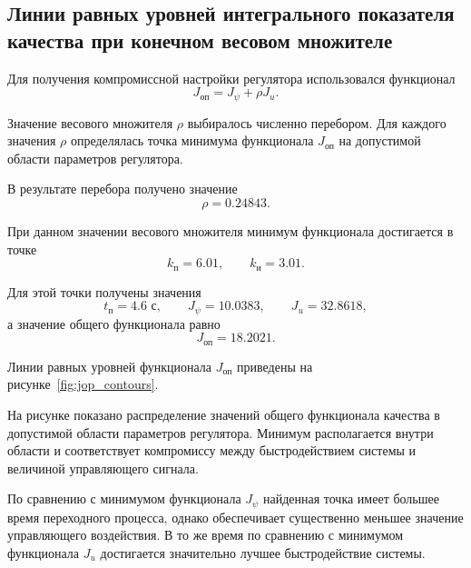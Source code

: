 \subsection{Линии равных уровней интегрального показателя качества при конечном весовом множителе}

Для получения компромиссной настройки регулятора использовался функционал
\begin{equation}
J_{\text{оп}}
=
J_{\psi}
+
\rho J_u.
\end{equation}

Значение весового множителя \(\rho\) выбиралось численно перебором. Для каждого значения \(\rho\) определялась точка минимума функционала \(J_{\text{оп}}\) на допустимой области параметров регулятора.

В результате перебора получено значение
\begin{equation}
\rho = 0.24843.
\end{equation}

При данном значении весового множителя минимум функционала достигается в точке
\begin{equation}
k_{\text{п}} = 6.01,
\qquad
k_{\text{и}} = 3.01.
\end{equation}

Для этой точки получены значения
\begin{equation}
t_{\text{п}} = 4.6 \text{ с},
\qquad
J_{\psi}=10.0383,
\qquad
J_u=32.8618,
\end{equation}
а значение общего функционала равно
\begin{equation}
J_{\text{оп}}=18.2021.
\end{equation}

Линии равных уровней функционала \(J_{\text{оп}}\) приведены на рисунке~\ref{fig:jop_contours}.


На рисунке показано распределение значений общего функционала качества в допустимой области параметров регулятора. Минимум располагается внутри области и соответствует компромиссу между быстродействием системы и величиной управляющего сигнала.

По сравнению с минимумом функционала \(J_{\psi}\) найденная точка имеет большее время переходного процесса, однако обеспечивает существенно меньшее значение управляющего воздействия. В то же время по сравнению с минимумом функционала \(J_u\) достигается значительно лучшее быстродействие системы.

